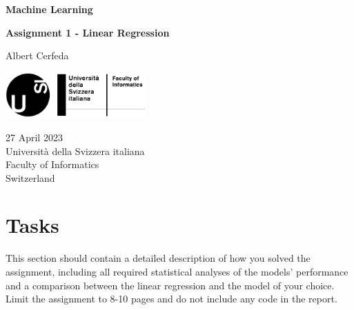 \documentclass[tikz,14pt,fleqn]{article}
\newcommand\namesurname{Albert Cerfeda}
\newcommand\assignment{Assignment 1 - Linear Regression}
\newcommand\subject{Machine Learning}
\newcommand\documentdate{27 April 2023}
\begin{document}
\begin{titlepage}
   \begin{center}
       \vspace*{0.2cm}

       \textbf{\Large{\subject}}

       \vspace{0.5cm}
        \textbf{\assignment}\\[5mm]
        
            
       \vspace{0.4cm}

        \namesurname
        \begin{figure}[H]
            \centering
        \end{figure}
       \tableofcontents

       \vspace*{\fill}
     
        \includegraphics[width=0.4\textwidth]{fig/logo.png}
       
        \documentdate \\
        Università della Svizzera italiana\\
        Faculty of Informatics\\
        Switzerland\\

   \end{center}
\end{titlepage}


\section{Tasks}

This section should contain a detailed description of how you solved the assignment, including all required statistical analyses of the models' performance and a comparison between the linear regression and the model of your choice. Limit the assignment to 8-10 pages and do not include any code in the report.
\end{document}
